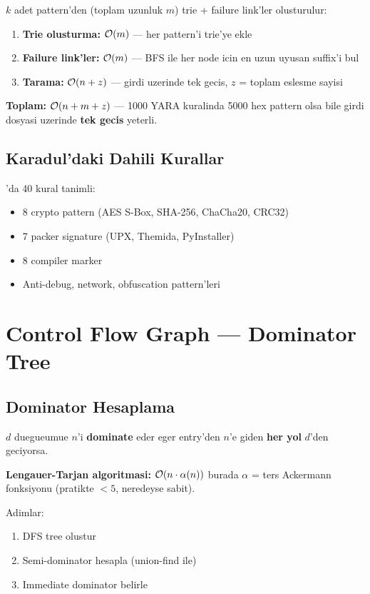 $k$ adet pattern'den (toplam uzunluk $m$) trie + failure link'ler olusturulur:

\begin{enumerate}
\item \textbf{Trie olusturma:} $\mathcal{O}\!\left(m\right)$ --- her pattern'i trie'ye ekle
\item \textbf{Failure link'ler:} $\mathcal{O}\!\left(m\right)$ --- BFS ile her node icin en uzun uyusan suffix'i bul
\item \textbf{Tarama:} $\mathcal{O}\!\left(n + z\right)$ --- girdi uzerinde tek gecis, $z$ = toplam eslesme sayisi
\end{enumerate}

\textbf{Toplam:} $\mathcal{O}\!\left(n + m + z\right)$ --- 1000 YARA kuralinda 5000 hex pattern olsa bile girdi dosyasi uzerinde \textbf{tek gecis} yeterli.

\subsection{Karadul'daki Dahili Kurallar}

'da 40 kural tanimli:
\begin{itemize}
\item 8 crypto pattern (AES S-Box, SHA-256, ChaCha20, CRC32)
\item 7 packer signature (UPX, Themida, PyInstaller)
\item 8 compiler marker
\item Anti-debug, network, obfuscation pattern'leri
\end{itemize}


\section{Control Flow Graph --- Dominator Tree}
\label{sec:cfg-deep}

\subsection{Dominator Hesaplama}

$d$ duegueumue $n$'i \textbf{dominate} eder eger entry'den $n$'e giden \textbf{her yol} $d$'den geciyorsa.

\textbf{Lengauer-Tarjan algoritmasi:} $\mathcal{O}\!\left(n \cdot \alpha(n)\right)$ burada $\alpha$ = ters Ackermann fonksiyonu (pratikte $< 5$, neredeyse sabit).

Adimlar:
\begin{enumerate}
\item DFS tree olustur
\item Semi-dominator hesapla (union-find ile)
\item Immediate dominator belirle
\end{enumerate}

